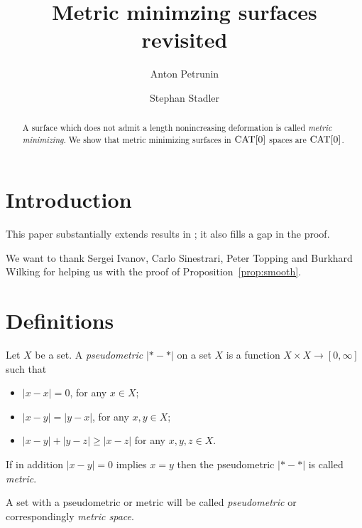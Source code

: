 \documentclass[a4paper,10pt]{amsart}
\begin{document}
\title{Metric minimzing surfaces revisited}
\author{Anton Petrunin}
\address{A. Petrunin\newline\vskip-4mm
Math. Dept. PSU,
University Park, PA 16802,
USA}
\author{Stephan Stadler}
\address{S. Stadler\newline\vskip-4mm
Math. Inst.,
Universit\"at M\"unchen, Theresienstr. 39, D-80333 M\"unchen, Germany}


\date{}

\begin{abstract}
A surface which does not admit a length nonincreasing deformation is called \emph{metric minimizing}.
We show that metric minimizing surfaces in $\mathop{\rm CAT}\nolimits[0]$ spaces are $\mathop{\rm CAT}\nolimits[0]$.
\end{abstract}
\maketitle

\section{Introduction}

This paper substantially extends results in \cite{petrunin-metric-min}; it also fills a gap in the proof. 

\medskip

We want to thank 
Sergei Ivanov,
Carlo Sinestrari,
Peter Topping
and
Burkhard Wilking
for helping us with the proof of Proposition~\ref{prop:smooth}.

\section{Definitions}\label{sec:Def}

Let $X$ be a set.
A \emph{pseudometric} $|{*}-{*}|$ on a set $X$ 
is a function $X\times X\to[0,\infty]$
such that 
\begin{itemize}
\item $|x-x|=0$, for any $x\in X$;
\item $|x-y|=|y-x|$, for any $x,y\in X$;
\item $|x-y|+|y-z|\ge|x-z|$ for any  $x,y,z\in X$.
\end{itemize}
If in addition $|x-y|=0$ implies $x=y$ then the pseudometric $|{*}-{*}|$ is called \emph{metric}.

A set with a pseudometric or metric will be called \emph{pseudometric} or correspondingly \emph{metric space}.
\end{document}
